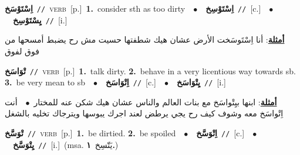 \documentclass[10pt,a4paper,twoside]{article} %
\begin{document}
\begin{multicols}{2}
{\setlength\topsep{0pt}\textbf{\foreignlanguage{arabic}{اِسْتَوْسَخ}}\ {\color{gray}\texttt{//}\color{black}}\ \textsc{verb}\ [p.]\ \textbf{1.}~consider sth as too dirty\ \ $\bullet$\ \ \setlength\topsep{0pt}\textbf{\foreignlanguage{arabic}{اِسْتَوْسِخ}}\ {\color{gray}\texttt{//}\color{black}}\ [c.]\ \ $\bullet$\ \ \setlength\topsep{0pt}\textbf{\foreignlanguage{arabic}{يِسْتَوْسِخ}}\ {\color{gray}\texttt{//}\color{black}}\ [i.]\  \begin{flushright}\color{gray}\foreignlanguage{arabic}{\textbf{\underline{\foreignlanguage{arabic}{أمثلة}}}: أنا اِسْتَوسَخت الأرض عشان هيك شطفتها حسيت مش رح يضبط أمسحها من فوق لفوق}\end{flushright}\color{black}} \vspace{2mm}

{\setlength\topsep{0pt}\textbf{\foreignlanguage{arabic}{تْوَاسَخ}}\ {\color{gray}\texttt{//}\color{black}}\ \textsc{verb}\ [p.]\ \textbf{1.}~talk dirty.  \textbf{2.}~behave in a very licentious way towards sb.  \textbf{3.}~be very mean to sb\ \ $\bullet$\ \ \setlength\topsep{0pt}\textbf{\foreignlanguage{arabic}{اِتْوَاسَخ}}\ {\color{gray}\texttt{//}\color{black}}\ [c.]\ \ $\bullet$\ \ \setlength\topsep{0pt}\textbf{\foreignlanguage{arabic}{يِتْوَاسَخ}}\ {\color{gray}\texttt{//}\color{black}}\ [i.]\  \begin{flushright}\color{gray}\foreignlanguage{arabic}{\textbf{\underline{\foreignlanguage{arabic}{أمثلة}}}: ابنها بيِتْواسَخ مع بنات العالم والناس عشان هيك شكن عنه للمختار\ $\bullet$\ \  أنت اِتْواسَخ معه وشوف كيف رح يجي يرطض لعند اجرك يبوسها ويترجاك تخليه بالشغل}\end{flushright}\color{black}} \vspace{2mm}

{\setlength\topsep{0pt}\textbf{\foreignlanguage{arabic}{تْوَسَّخ}}\ {\color{gray}\texttt{//}\color{black}}\ \textsc{verb}\ [p.]\ \textbf{1.}~be dirtied.  \textbf{2.}~be spoiled\ \ $\bullet$\ \ \setlength\topsep{0pt}\textbf{\foreignlanguage{arabic}{اِتْوَسَّخ}}\ {\color{gray}\texttt{//}\color{black}}\ [c.]\ \ $\bullet$\ \ \setlength\topsep{0pt}\textbf{\foreignlanguage{arabic}{يِتْوَسَّخ}}\ {\color{gray}\texttt{//}\color{black}}\ [i.]\ \color{gray}(msa. \foreignlanguage{arabic}{يَتّسِخ}~\foreignlanguage{arabic}{\textbf{١.}})\color{black}\ } \vspace{2mm}


\end{multicols}
\end{document}

